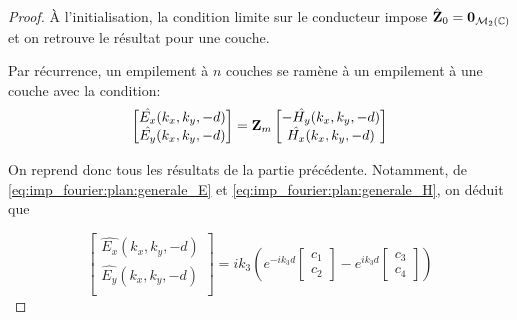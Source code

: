         \begin{proof}
            À l'initialisation, la condition limite sur le conducteur impose $\hat {\mathbf{Z}}_0 = \mathbf{0}_{\mathcal{M}_2(\mathbb C)}$ et on retrouve le résultat pour une couche.

            Par récurrence, un empilement à $n$ couches se ramène à un empilement à une couche avec la condition:
            \begin{equation}
                \begin{bmatrix}
                    \hat{E_x}(k_x,k_y,-d)\\
                    \hat{E_y}(k_x,k_y,-d)\\
                \end{bmatrix}
                =
                \mathbf{Z}_m
                \begin{bmatrix}
                    -\hat{H_y}(k_x,k_y,-d)\\
                    \hat{H_x}(k_x,k_y,-d)\\
                \end{bmatrix}
            \end{equation}

            On reprend donc tous les résultats de la partie précédente. Notamment, de \eqref{eq:imp_fourier:plan:generale_E} et \eqref{eq:imp_fourier:plan:generale_H}, on déduit que

            \begin{equation}
                \begin{bmatrix}
                    \hat{E_x}(k_x,k_y,-d)\\
                    \hat{E_y}(k_x,k_y,-d)\\
                \end{bmatrix}
                = ik_3\left( e^{-ik_3 d}
                \begin{bmatrix}
                    c_1 \\
                    c_2
                \end{bmatrix}
                -e^{ik_3 d}
                \begin{bmatrix}
                    c_3 \\
                    c_4
                \end{bmatrix}
                \right)
            \end{equation}


\end{proof}

